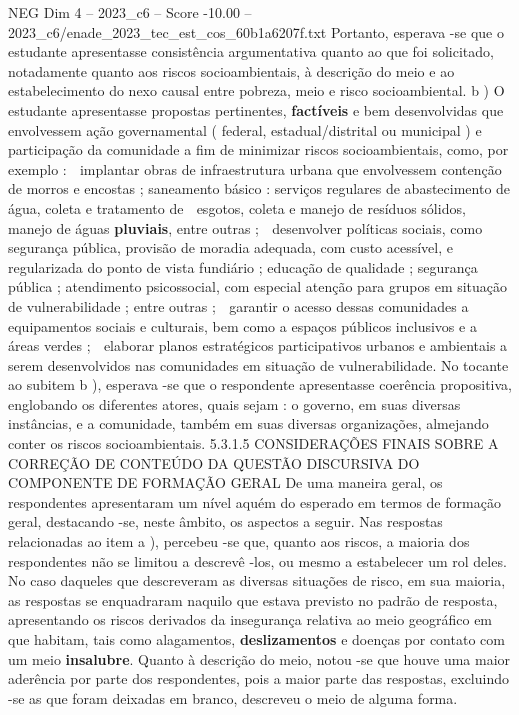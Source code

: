 \begin{textsample}{NEG Dim 4 – 2023\_c6 – Score -10.00 – 2023\_c6/enade\_2023\_tec\_est\_cos\_60b1a6207f.txt}
Portanto, esperava -se que o estudante apresentasse consistência argumentativa quanto ao que foi solicitado, notadamente quanto aos riscos socioambientais, à descrição do meio e ao estabelecimento do nexo causal entre pobreza, meio e risco socioambiental. b ) O estudante apresentasse propostas pertinentes, \textbf{factíveis} e bem desenvolvidas que envolvessem ação governamental ( federal, estadual/distrital ou municipal ) e participação da comunidade a fim de minimizar riscos socioambientais, como, por exemplo :  implantar obras de infraestrutura urbana que envolvessem contenção de morros e encostas ; saneamento básico : serviços regulares de abastecimento de água, coleta e tratamento de  esgotos, coleta e manejo de resíduos sólidos, manejo de águas \textbf{pluviais}, entre outras ;  desenvolver políticas sociais, como segurança pública, provisão de moradia adequada, com custo acessível, e regularizada do ponto de vista fundiário ; educação de qualidade ; segurança pública ; atendimento psicossocial, com especial atenção para grupos em situação de vulnerabilidade ; entre outras ;  garantir o acesso dessas comunidades a equipamentos sociais e culturais, bem como a espaços públicos inclusivos e a áreas verdes ;  elaborar planos estratégicos participativos urbanos e ambientais a serem desenvolvidos nas comunidades em situação de vulnerabilidade.
No tocante ao subitem b ), esperava -se que o respondente apresentasse coerência propositiva, englobando os diferentes atores, quais sejam : o governo, em suas diversas instâncias, e a comunidade, também em suas diversas organizações, almejando conter os riscos socioambientais. 5.3.1.5 CONSIDERAÇÕES FINAIS SOBRE A CORREÇÃO DE CONTEÚDO DA QUESTÃO DISCURSIVA DO COMPONENTE DE FORMAÇÃO GERAL De uma maneira geral, os respondentes apresentaram um nível aquém do esperado em termos de formação geral, destacando -se, neste âmbito, os aspectos a seguir.
Nas respostas relacionadas ao item a ), percebeu -se que, quanto aos riscos, a maioria dos respondentes não se limitou a descrevê -los, ou mesmo a estabelecer um rol deles.
No caso daqueles que descreveram as diversas situações de risco, em sua maioria, as respostas se enquadraram naquilo que estava previsto no padrão de resposta, apresentando os riscos derivados da insegurança relativa ao meio geográfico em que habitam, tais como alagamentos, \textbf{deslizamentos} e doenças por contato com um meio \textbf{insalubre}.
Quanto à descrição do meio, notou -se que houve uma maior aderência por parte dos respondentes, pois a maior parte das respostas, excluindo -se as que foram deixadas em branco, descreveu o meio de alguma forma.

\end{textsample}
